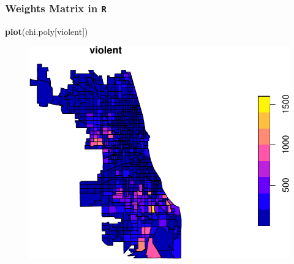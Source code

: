 \documentclass[
  shownotes,
  xcolor={svgnames},
  hyperref={colorlinks,citecolor=DarkBlue,linkcolor=DarkRed,urlcolor=DarkBlue}
  ]{beamer}
\newenvironment{Shaded}{\begin{snugshade}}{\end{snugshade}}
\newcommand{\KeywordTok}[1]{\textcolor[rgb]{0.13,0.29,0.53}{\textbf{#1}}}
\newcommand{\NormalTok}[1]{#1}
\newcommand{\StringTok}[1]{\textcolor[rgb]{0.31,0.60,0.02}{#1}}
\begin{document}
\begin{frame}[fragile]
\frametitle{Weights Matrix in \texttt{R}}

\begin{scriptsize}
\begin{Shaded}
\begin{Highlighting}[]
\KeywordTok{plot}\NormalTok{(chi.poly[}\StringTok{\textquotesingle{}violent\textquotesingle{}}\NormalTok{])}
\end{Highlighting}
\end{Shaded}
\end{scriptsize}



  \begin{figure}[H] \centering
    \captionsetup{justification=centering}
    \includegraphics[scale=0.5]{Example_12_files/figure-latex/unnamed-chunk-2-1.pdf}
   \end{figure}



\end{frame}
\end{document}

